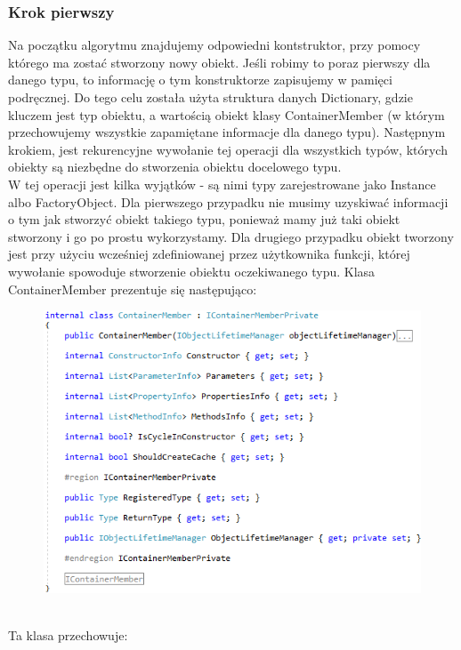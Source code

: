 \documentclass[12pt]{article}
\begin{document}
\subsubsection{Krok pierwszy}
Na początku algorytmu znajdujemy odpowiedni kontstruktor, przy pomocy którego ma zostać stworzony nowy obiekt. Jeśli robimy to poraz pierwszy dla danego typu, to informację o tym konstruktorze zapisujemy w pamięci podręcznej. Do tego celu została użyta struktura danych Dictionary, gdzie kluczem jest typ obiektu, a wartością obiekt klasy ContainerMember (w którym przechowujemy wszystkie zapamiętane informacje dla danego typu). Następnym krokiem, jest rekurencyjne wywołanie tej operacji dla wszystkich typów, których obiekty są niezbędne do stworzenia obiektu docelowego typu.\\
W tej operacji jest kilka wyjątków - są nimi typy zarejestrowane jako Instance albo FactoryObject. Dla pierwszego przypadku nie musimy uzyskiwać informacji o tym jak stworzyć obiekt takiego  typu, ponieważ mamy już taki obiekt stworzony i go po prostu wykorzystamy. Dla drugiego przypadku obiekt tworzony jest przy użyciu wcześniej zdefiniowanej przez użytkownika funkcji, której wywołanie spowoduje stworzenie obiektu oczekiwanego typu.
\clearpage
Klasa ContainerMember prezentuje się następująco:
\begin{figure}[h]
	\begin{raggedleft}
  		\includegraphics{ContainerMember.png}
	\end{raggedleft}
\end{figure}\\
Ta klasa przechowuje:
\end{document}
